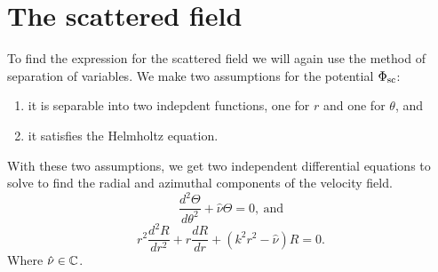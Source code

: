 \section{The scattered field}\label{ss:scattered_field}
To find the expression for the scattered field we will again use the method of separation of variables. We make two assumptions for the potential $\Phi_{\text{sc}}$:
\begin{enumerate}[label=(\roman*)]
  \item it is separable into two indepdent functions, one for $r$ and one for $\theta$, and
  \item it satisfies the Helmholtz equation.
\end{enumerate}
%
\begin{propn}\label{propn:scattered_field_differential_equations}
  With these two assumptions, we get two independent differential equations to solve to find the radial and azimuthal components of the velocity field.
  \begin{equation}\label{eq:ch2_theta_dep}
      \frac{d^2 \Theta}{d\theta^2} + \hat{\nu} \Theta = 0, ~\text{and}
  \end{equation}
  \begin{equation}\label{eq:ch2_r_dep}
      r^2 \frac{d^2 R}{dr^2} + r \frac{d R}{dr} + (k^2r^2 - \hat{\nu}) R = 0.
  \end{equation}
  Where $\hat{\nu} \in \mathbb{C}$.
\end{propn}
%
